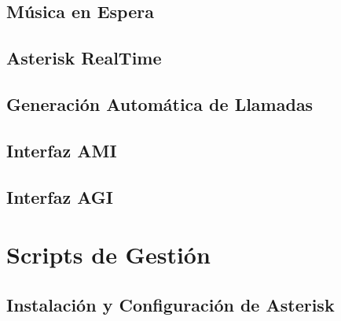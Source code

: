 

\subsection*{Música en Espera}



\subsection*{Asterisk RealTime}









\subsection*{Generación Automática de Llamadas}



\subsection*{Interfaz AMI}



\subsection*{Interfaz AGI}




\section*{Scripts de Gestión}

\subsection*{Instalación y Configuración de Asterisk}

